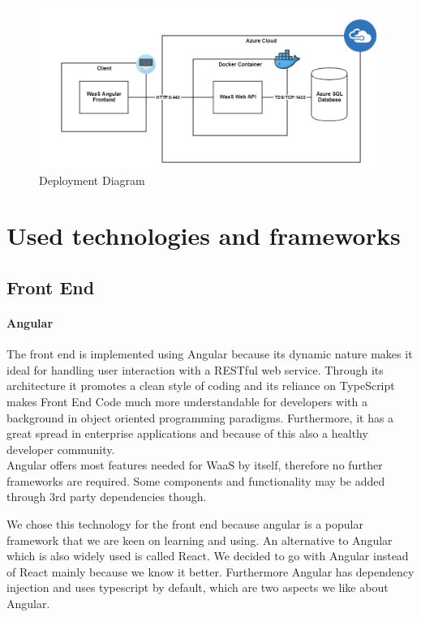 \documentclass[titlepage, 12pt]{article}
\begin{document}
\begin{figure}[H]
  \includegraphics[width=0.95\linewidth]{DeploymentDiagram.png}
  \caption{Deployment Diagram}
  \label{fig:deploymentDiagram}
\end{figure}

\pagebreak

\section{Used technologies and frameworks}

\subsection{Front End}

\paragraph{Angular}
The front end is implemented using Angular because its dynamic nature makes it ideal for handling user interaction with a RESTful web service.
Through its architecture it promotes a clean style of coding and its reliance on TypeScript makes Front End Code much more understandable for developers with a background in object oriented programming paradigms.
Furthermore, it has a great spread in enterprise applications and because of this also a healthy developer community. \\
Angular offers most features needed for WaaS by itself, therefore no further frameworks are required. Some components and functionality may be added through 3rd party dependencies though.

We chose this technology for the front end because angular is a popular framework that we are keen on learning and using. An alternative to Angular which is also widely used is called React. We decided to go with Angular instead of React mainly because we know it better. Furthermore Angular has dependency injection and uses typescript by default, which are two aspects we like about Angular.
\end{document}
